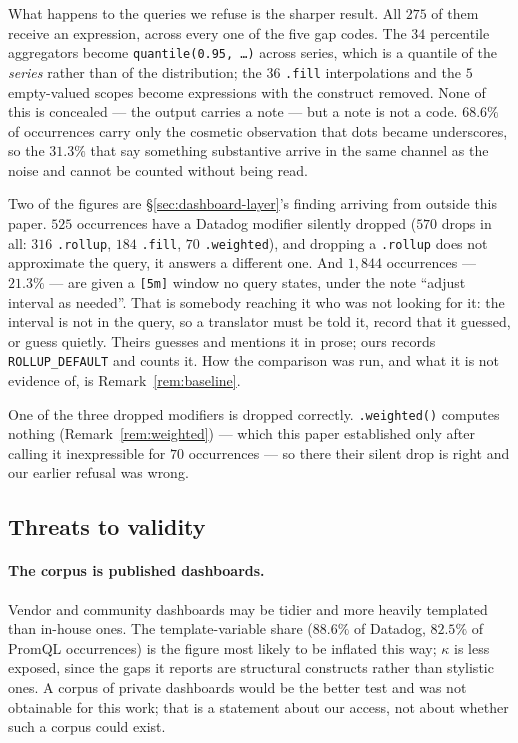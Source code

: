 What happens to the queries we refuse is the sharper result. All $275$ of them receive
an expression, across every one of the five gap codes. The $34$ percentile aggregators
become \texttt{quantile(0.95, \ldots)} across series, which is a quantile of the
\emph{series} rather than of the distribution; the $36$ \texttt{.fill} interpolations
and the $5$ empty-valued scopes become expressions with the construct removed. None of this is concealed
--- the output carries a note --- but a note is not a code. $68.6\%$ of occurrences carry
only the cosmetic observation that dots became underscores, so the $31.3\%$ that say
something substantive arrive in the same channel as the noise and cannot be counted
without being read.

Two of the figures are \S\ref{sec:dashboard-layer}'s finding arriving from outside
this paper. $525$
occurrences have a Datadog modifier silently dropped ($570$ drops in all: $316$
\texttt{.rollup}, $184$ \texttt{.fill}, $70$ \texttt{.weighted}), and dropping a
\texttt{.rollup} does not approximate the query, it answers a different one. And
$1{,}844$ occurrences --- $21.3\%$ --- are given a \texttt{[5m]} window no query states,
under the note ``adjust interval as needed''. That is somebody reaching it who was not
looking for it: the interval is not in the query, so a translator must be told it, record
that it guessed, or guess quietly. Theirs guesses and mentions it in prose; ours records
\texttt{ROLLUP\_DEFAULT} and counts it. How the comparison was run, and what it is not
evidence of, is Remark~\ref{rem:baseline}.

One of the three dropped modifiers is dropped correctly. \texttt{.weighted()} computes
nothing (Remark~\ref{rem:weighted}) --- which this paper established only after calling
it inexpressible for $70$ occurrences --- so there their silent drop is right and our
earlier refusal was wrong.

\iffull\fi

\subsection{Threats to validity}
\label{sec:threats}

\paragraph{The corpus is published dashboards.}
Vendor and community dashboards may be tidier and more heavily templated than
in-house ones. The template-variable share ($88.6\%$ of Datadog, $82.5\%$ of PromQL occurrences)
is the figure most likely to be inflated this way; $\kappa$ is less exposed, since the
gaps it reports are structural constructs rather than stylistic ones. A corpus of
private dashboards would be the better test and was not obtainable for this work; that
is a statement about our access, not about whether such a corpus could exist.

